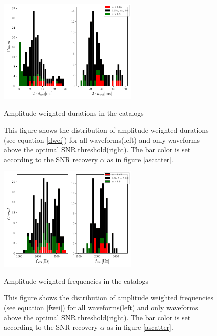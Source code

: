 \begin{figure}[hbt!]
\begin{center}
\includegraphics[width=0.6\textwidth, angle=0]{images/Data_analysis/results/alpha_dhist.pdf}
\captionsetup{width=0.8\textwidth}
\caption{Amplitude weighted durations in the catalogs}
\caption*{This figure shows the distribution of amplitude weighted durations (see equation \ref{dwei}) for all waveforms(left) and only waveforms above the optimal SNR threshold(right). The bar color is set according to the SNR recovery $\alpha$ as in figure \ref{ascatter}.}
\label{adhist}
\end{center}
\end{figure}

\begin{figure}[hbt!]
\begin{center}
\includegraphics[width=0.6\textwidth, angle=0]{images/Data_analysis/results/alpha_fhist.pdf}
\captionsetup{width=0.8\textwidth}
\caption{Amplitude weighted frequencies in the catalogs}
\caption*{This figure shows the distribution of amplitude weighted frequencies (see equation \ref{fwei}) for all waveforms(left) and only waveforms above the optimal SNR threshold(right). The bar color is set according to the SNR recovery $\alpha$ as in figure \ref{ascatter}.}
\label{afhist}
\end{center}
\end{figure}
\FloatBarrier


